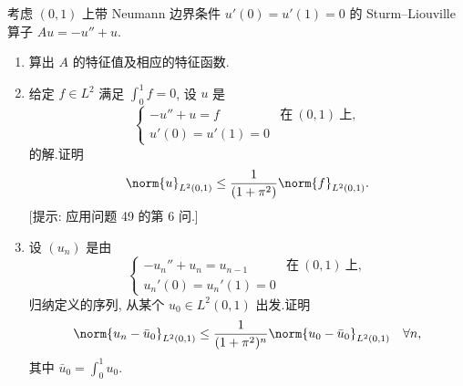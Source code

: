 \begin{exercise}
\label{exer:8.31}
考虑 $(0,1)$ 上带 Neumann 边界条件 $u'(0)=u'(1)=0$ 的 Sturm--Liouville
算子 $Au=-u''+u$.
\begin{enumerate}[label=\arabic*., leftmargin=2.2em, itemsep=0.3em]
	\item 算出 $A$ 的特征值及相应的特征函数.
	\item 给定 $f\in L^2$ 满足 $\int_0^1f=0$, 设 $u$ 是
	      \begin{equation*}
	      \begin{cases}
	      -u''+u=f & \text{在}\ (0,1)\ \text{上},\\
	      u'(0)=u'(1)=0
	      \end{cases}
	      \end{equation*}
	      的解.证明
	      \begin{equation*}
	      \norm{u}_{L^2(0,1)}\le\frac{1}{(1+\pi^2)}\norm{f}_{L^2(0,1)}.
	      \end{equation*}
	      [提示: 应用问题 49 的第 6 问.]
	\item 设 $(u_n)$ 是由
	      \begin{equation*}
	      \begin{cases}
	      -u_n''+u_n=u_{n-1} & \text{在}\ (0,1)\ \text{上},\\
	      u_n'(0)=u_n'(1)=0
	      \end{cases}
	      \end{equation*}
	      归纳定义的序列, 从某个 $u_0\in L^2(0,1)$ 出发.证明
	      \begin{equation*}
	      \norm{u_n-\bar u_0}_{L^2(0,1)}
	      \le\frac{1}{(1+\pi^2)^n}\norm{u_0-\bar u_0}_{L^2(0,1)}
	      \quad\forall n,
	      \end{equation*}
	      其中 $\bar u_0=\int_0^1u_0$.
\end{enumerate}
\end{exercise}

